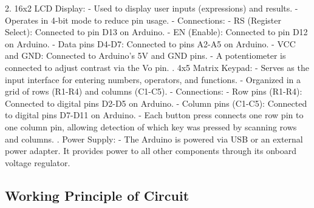 \documentclass[12pt]{article}
\begin{document}
2. 16x2 LCD Display:\newline
   - Used to display user inputs (expressions) and results.\newline
   - Operates in 4-bit mode to reduce pin usage.\newline
   - Connections:\newline
     - RS (Register Select): Connected to pin D13 on Arduino.\newline
     - EN (Enable): Connected to pin D12 on Arduino.\newline
     - Data pins D4-D7: Connected to pins A2-A5 on Arduino.\newline
     - VCC and GND: Connected to Arduino's 5V and GND pins.\newline
     - A potentiometer is connected to adjust contrast via the Vo pin.
     . 4x5 Matrix Keypad:\newline
   - Serves as the input interface for entering numbers, operators, and functions.\newline
   - Organized in a grid of rows (R1-R4) and columns (C1-C5).\newline
   - Connections:\newline
     - Row pins (R1-R4): Connected to digital pins D2-D5 on Arduino.\newline
     - Column pins (C1-C5): Connected to digital pins D7-D11 on Arduino.\newline
   - Each button press connects one row pin to one column pin, allowing detection of which key was pressed by scanning rows and columns.
   . Power Supply:\newline
   - The Arduino is powered via USB or an external power adapter. It provides power to all other components through its onboard voltage regulator.

\subsection*{Working Principle of Circuit}
\end{document}
